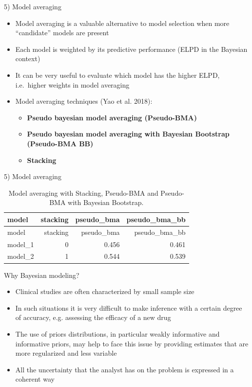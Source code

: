 \documentclass[ignorenonframetext,a4paper]{beamer}
\providecommand{\tightlist}{%
  \setlength{\itemsep}{0pt}\setlength{\parskip}{0pt}}
\begin{document}
\begin{frame}{5) Model averaging}

\begin{itemize}
\item
  Model averaging is a valuable alternative to model selection when more
  ``candidate'' models are present
\item
  Each model is weighted by its predictive performance (ELPD in the
  Bayesian context)
\item
  It can be very useful to evaluate which model has the higher ELPD,
  i.e.~higher weights in model averaging
\item
  Model averaging techniques (Yao et al. 2018):

  \begin{itemize}
  \tightlist
  \item
    \textbf{Pseudo bayesian model averaging (Pseudo-BMA)}
  \item
    \textbf{Pseudo bayesian model averaging with Bayesian Bootstrap
    (Pseudo-BMA BB)}
  \item
    \textbf{Stacking}
  \end{itemize}
\end{itemize}

\end{frame}

\begin{frame}{5) Model averaging}

\begin{longtable}[]{@{}lrrr@{}}
\caption{Model averaging with Stacking, Pseudo-BMA and Pseudo-BMA with
Bayesian Bootstrap.}\tabularnewline
\toprule
model & stacking & pseudo\_bma & pseudo\_bma\_bb\tabularnewline
\midrule
\endfirsthead
\toprule
model & stacking & pseudo\_bma & pseudo\_bma\_bb\tabularnewline
\midrule
\endhead
model\_1 & 0 & 0.456 & 0.461\tabularnewline
model\_2 & 1 & 0.544 & 0.539\tabularnewline
\bottomrule
\end{longtable}

\end{frame}

\begin{frame}{Why Bayesian modeling?}

\begin{itemize}
\setlength\itemsep{1em}
  \item{Clinical studies are often characterized by small sample size}
  \item{In such situations it is very difficult to make inference
        with a certain degree of accuracy, e.g. assessing the efficacy
        of a new drug}
  \item{The use of priors distributions, in particular weakly 
        informative and informative priors, may help to face this 
        issue by providing estimates that are more regularized and
        less variable}
  \item{All the uncertainty that the analyst has on the problem is
        expressed in a coherent way}
\end{itemize}

\end{frame}
\end{document}
